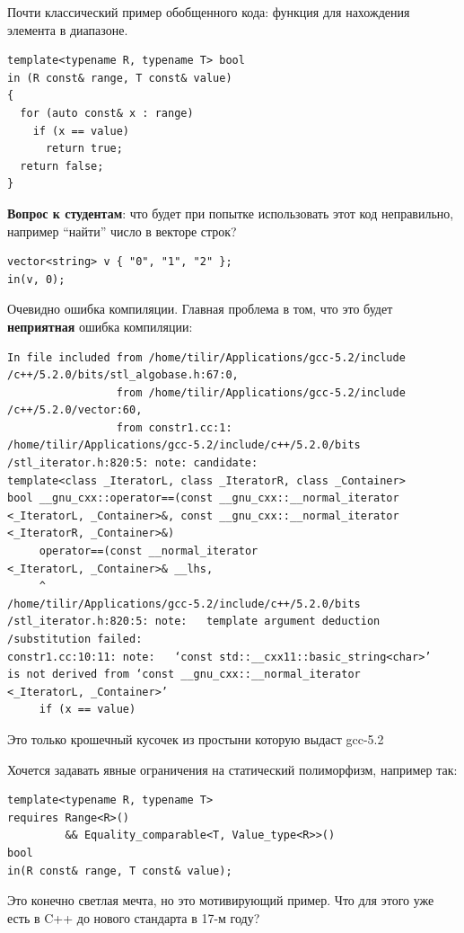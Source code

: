 \documentclass[a4paper,12pt,oneside]{article}
\newif\ifanswers
\begin{document}
Почти классический пример обобщенного кода: функция для нахождения элемента в диапазоне.

\begin{lstlisting}
template<typename R, typename T> bool 
in (R const& range, T const& value) 
{
  for (auto const& x : range)
    if (x == value)
      return true;
  return false;
}
\end{lstlisting}

\textbf{Вопрос к студентам}: что будет при попытке использовать этот код неправильно, например ``найти'' число в векторе строк?

\begin{lstlisting}
vector<string> v { "0", "1", "2" };
in(v, 0);
\end{lstlisting}

Очевидно ошибка компиляции. Главная проблема в том, что это будет \textbf{неприятная} ошибка компиляции:

\begin{verbatim}
In file included from /home/tilir/Applications/gcc-5.2/include
/c++/5.2.0/bits/stl_algobase.h:67:0,
                 from /home/tilir/Applications/gcc-5.2/include
/c++/5.2.0/vector:60,
                 from constr1.cc:1:
/home/tilir/Applications/gcc-5.2/include/c++/5.2.0/bits
/stl_iterator.h:820:5: note: candidate: 
template<class _IteratorL, class _IteratorR, class _Container> 
bool __gnu_cxx::operator==(const __gnu_cxx::__normal_iterator
<_IteratorL, _Container>&, const __gnu_cxx::__normal_iterator
<_IteratorR, _Container>&)
     operator==(const __normal_iterator
<_IteratorL, _Container>& __lhs,
     ^
/home/tilir/Applications/gcc-5.2/include/c++/5.2.0/bits
/stl_iterator.h:820:5: note:   template argument deduction
/substitution failed:
constr1.cc:10:11: note:   ‘const std::__cxx11::basic_string<char>’ 
is not derived from ‘const __gnu_cxx::__normal_iterator
<_IteratorL, _Container>’
     if (x == value)
\end{verbatim}

Это только крошечный кусочек из простыни которую выдаст gcc-5.2

Хочется задавать явные ограничения на статический полиморфизм, например так:

\begin{lstlisting}
template<typename R, typename T>
requires Range<R>() 
         && Equality_comparable<T, Value_type<R>>()
bool 
in(R const& range, T const& value);
\end{lstlisting}

Это конечно светлая мечта, но это мотивирующий пример. Что для этого уже есть в C++ до нового стандарта в 17-м году?
\end{document}
